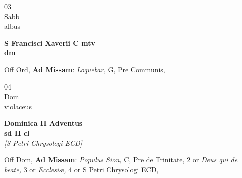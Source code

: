 \documentclass[10pt, openany]{book}
\begin{document}
        \begin{center}
            \begin{minipage}{3.5in}
                \vspace{2em}
                \begin{minipage}{0.5in}
                    {\Huge 03} \\
                    {\normalsize Sabb} \\
                    {\normalsize albus}
                \end{minipage}
                \begin{minipage}{3.0in}
                    \textbf{ \large S Francisci Xaverii C mtv \\
                    \textnormal{\normalsize dm}} \\ 
                \end{minipage}
                \begin{justify}Off Ord, \textbf{Ad Missam}: \textit{Loquebar,} G, Pre Communis,   
                \end{justify}
            \end{minipage}
        \end{center}
    
        \begin{center}
            \begin{minipage}{3.5in}
                \vspace{2em}
                \begin{minipage}{0.5in}
                    {\Huge 04} \\
                    {\normalsize Dom} \\
                    {\normalsize violaceus}
                \end{minipage}
                \begin{minipage}{3.0in}
                    \textbf{ \large Dominica II Adventus \\
                    \textnormal{\normalsize sd II cl}} \\ \textit{[S Petri Chrysologi ECD]} \\ 
                \end{minipage}
                \begin{justify}Off Dom, \textbf{Ad Missam}: \textit{Populus Sion,} C, Pre de Trinitate, 2 or \textit{Deus qui de beate,} 3 or \textit{Ecclesiæ,} 4 or S Petri Chrysologi ECD,   
                \end{justify}
            \end{minipage}
        \end{center}
    
\end{document}
